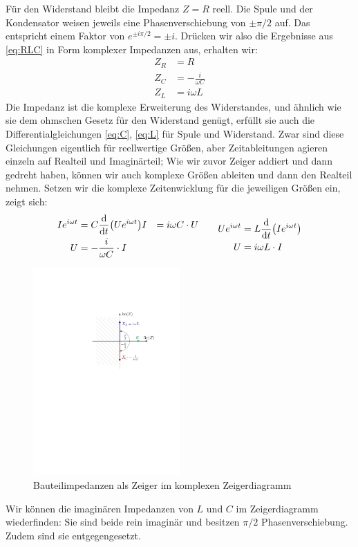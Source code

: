 Für den Widerstand bleibt die Impedanz $Z = R$ reell. Die Spule und der Kondensator weisen jeweils eine
Phasenverschiebung von $\pm \pi/2$ auf. Das entspricht einem Faktor von $e^{\pm i\pi/2}= \pm i$. Drücken wir also die
Ergebnisse aus \eqref{eq:RLC} in Form komplexer Impedanzen aus, erhalten wir:
\begin{align}
    Z_R &= R \\
    Z_C &= -\frac i{\omega C} \\
    Z_L &= i\omega L
\end{align}
Die Impedanz ist die komplexe Erweiterung des Widerstandes, und ähnlich wie sie dem ohmschen Gesetz für den Widerstand
genügt, erfüllt sie auch die Differentialgleichungen \eqref{eq:C}, \eqref{eq:L} für Spule und Widerstand. Zwar sind
diese Gleichungen eigentlich für reellwertige Größen, aber Zeitableitungen agieren einzeln auf Realteil und
Imaginärteil; Wie wir zuvor Zeiger addiert und dann gedreht haben, können wir auch komplexe Größen ableiten und dann den
Realteil nehmen. Setzen wir die komplexe Zeitenwicklung für die jeweiligen Größen ein, zeigt sich:
\begin{gather*}
    \begin{aligned}
        Ie^{i\omega t} &= C\dv{t}(Ue^{i\omega t})
        I &= i\omega C \cdot U \\
        U &= - \frac{i}{\omega C} \cdot I
    \end{aligned}
    \qquad
    \begin{aligned}
        Ue^{i\omega t} &= L\dv{t}(Ie^{i\omega t}) \\
        U &= i\omega L \cdot I
    \end{aligned}
\end{gather*}
\begin{figure}[t]
    \centering
    \includegraphics[width=0.5\textwidth]{kCompZeiger.pdf}
    \caption{Bauteilimpedanzen als Zeiger im komplexen Zeigerdiagramm}
\end{figure}
Wir können die imaginären Impedanzen von $L$ und $C$ im Zeigerdiagramm wiederfinden: Sie sind beide
rein imaginär und besitzen $\pi/2$ Phasenverschiebung. Zudem sind sie entgegengesetzt.
